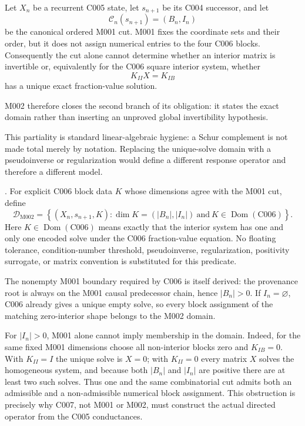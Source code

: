 Let $X_n$ be a recurrent C005 state, let $s_{n+1}$ be its C004 successor, and
let
\[
 \mathcal C_n(s_{n+1})=(B_n,I_n)
\]
be the canonical ordered M001 cut.  M001 fixes the coordinate sets and their
order, but it does not assign numerical entries to the four C006 blocks.
Consequently the cut alone cannot determine whether an interior matrix is
invertible or, equivalently for the C006 square interior system, whether
\[
 K_{II}X=K_{IB}
\]
has a unique exact fraction-value solution.

M002 therefore closes the second branch of its obligation: it states the exact
domain rather than inserting an unproved global invertibility hypothesis.

This partiality is standard linear-algebraic hygiene: a Schur complement is not made total merely by notation.  Replacing the unique-solve domain with a pseudoinverse or regularization would define a different response operator and therefore a different model.

\cite[Basic Properties, pp.~17--46]{Zhang2005SchurComplement}.
  For
explicit C006 block data $K$ whose dimensions agree with the M001 cut, define
\[
 \boxed{
 \mathcal D_{\mathrm{M002}}
 =\left\{(X_n,s_{n+1},K):
 \dim K=(|B_n|,|I_n|)\ \text{and}\
 K\in\operatorname{Dom}(\mathrm{C006})\right\}.}
\]
Here $K\in\operatorname{Dom}(\mathrm{C006})$ means exactly that the interior
system has one and only one encoded solve under the C006 fraction-value equation.  No floating tolerance,
condition-number threshold, pseudoinverse, regularization, positivity surrogate,
or matrix convention is substituted for this predicate.

The nonempty M001 boundary required by C006 is itself derived: the provenance
root is always on the M001 causal predecessor chain, hence $|B_n|>0$.
If $I_n=\varnothing$, C006 already gives a unique empty solve, so every block
assignment of the matching zero-interior shape belongs to the M002 domain.

For $|I_n|>0$, M001 alone cannot imply membership in the domain.  Indeed, for
the same fixed M001 dimensions choose all non-interior blocks zero and
$K_{IB}=0$.  With $K_{II}=I$ the unique solve is $X=0$; with $K_{II}=0$ every
matrix $X$ solves the homogeneous system, and because both $|B_n|$ and $|I_n|$
are positive there are at least two such solves.  Thus one and the same
combinatorial cut admits both an admissible and a non-admissible numerical block
assignment.  This obstruction is precisely why C007, not M001 or M002, must
construct the actual directed operator from the C005 conductances.

